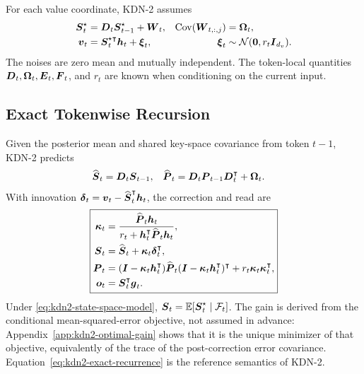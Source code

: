\documentclass[11pt,letterpaper,logo]{yalearxiv}
\begin{document}
For each value coordinate, KDN-2 assumes
\begin{equation}
\begin{aligned}
  \boldsymbol{S}_t^\star
  &=
  \boldsymbol{D}_t\boldsymbol{S}_{t-1}^\star+\boldsymbol{W}_t,
  &
  \operatorname{Cov}(\boldsymbol{W}_{t,:,j})
  &=
  \boldsymbol{\Omega}_t,
  \\
  \boldsymbol{v}_t
  &=
  \boldsymbol{S}_t^{\star\intercal}\boldsymbol{h}_t+\boldsymbol{\xi}_t,
  &
  \boldsymbol{\xi}_t
  &\sim\mathcal N(\boldsymbol{0},r_t\boldsymbol{I}_{d_v}).
\end{aligned}
\label{eq:kdn2-state-space-model}
\end{equation}
The noises are zero mean and mutually independent. The token-local quantities
$\boldsymbol{D}_t,\boldsymbol{\Omega}_t,\boldsymbol{E}_t,\boldsymbol{F}_t$, and $r_t$ are known when conditioning on the current
input.

\subsection{Exact Tokenwise Recursion}
\label{sec:kdn2-exact-tokenwise}

Given the posterior mean and shared key-space covariance from token $t-1$, KDN-2 predicts
\begin{equation}
\begin{aligned}
  \widehat{\boldsymbol{S}}_t
  &=
  \boldsymbol{D}_t\boldsymbol{S}_{t-1},
  &
  \widehat{\boldsymbol{P}}_t
  &=
  \boldsymbol{D}_t\boldsymbol{P}_{t-1}\boldsymbol{D}_t^{\intercal}
  +\boldsymbol{\Omega}_t.
\end{aligned}
\label{eq:kdn2-predict}
\end{equation}
With innovation
$\boldsymbol{\delta}_t=\boldsymbol{v}_t-\widehat{\boldsymbol{S}}_t^{\intercal}\boldsymbol{h}_t$, the correction and read are
\begin{equation}
\boxed{
\begin{aligned}
  \boldsymbol{\kappa}_t
  &=
  \frac{\widehat{\boldsymbol{P}}_t\boldsymbol{h}_t}
  {r_t+\boldsymbol{h}_t^{\intercal}\widehat{\boldsymbol{P}}_t\boldsymbol{h}_t},
  \\
  \boldsymbol{S}_t
  &=
  \widehat{\boldsymbol{S}}_t+\boldsymbol{\kappa}_t\boldsymbol{\delta}_t^{\intercal},
  \\
  \boldsymbol{P}_t
  &=
  (\boldsymbol{I}-\boldsymbol{\kappa}_t\boldsymbol{h}_t^{\intercal})
  \widehat{\boldsymbol{P}}_t
  (\boldsymbol{I}-\boldsymbol{\kappa}_t\boldsymbol{h}_t^{\intercal})^{\intercal}
  +
  r_t\boldsymbol{\kappa}_t\boldsymbol{\kappa}_t^{\intercal},
  \\
  \boldsymbol{o}_t
  &=
  \boldsymbol{S}_t^{\intercal}\boldsymbol{g}_t.
\end{aligned}}
\label{eq:kdn2-exact-recurrence}
\end{equation}
Under \eqref{eq:kdn2-state-space-model},
$\boldsymbol{S}_t=\mathbb{E}[\boldsymbol{S}_t^\star\mid\mathcal F_t]$. The gain is derived from the conditional
mean-squared-error objective, not assumed in advance: Appendix~\ref{app:kdn2-optimal-gain} shows
that it is the unique minimizer of that objective, equivalently of the trace of the
post-correction error covariance.
Equation~\eqref{eq:kdn2-exact-recurrence} is the reference semantics of KDN-2.
\end{document}
